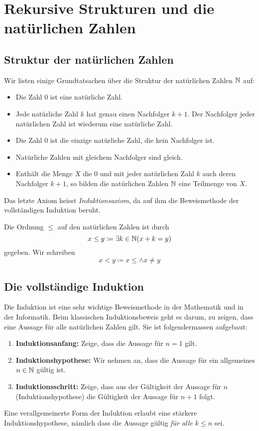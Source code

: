 \section{Rekursive Strukturen und die natürlichen Zahlen}\label{sec:rekursive-strukturen-und-die-naturlichen-zahlen}

\subsection{Struktur der natürlichen Zahlen}\label{subsec:struktur-der-naturlichen-zahlen}

Wir listen einige Grundtatsachen über die Struktur der natürlichen Zahlen $\mathbb{N}$ auf:
\begin{itemize}
    \item Die Zahl 0 ist eine natürliche Zahl.
    \item Jede natürliche Zahl $k$ hat genau einen Nachfolger $k + 1$.
    Der Nachfolger jeder natürlichen Zahl ist wiederum eine natürliche Zahl.
    \item Die Zahl 0 ist die einzige natürliche Zahl, die kein Nachfolger ist.
    \item Natürliche Zahlen mit gleichem Nachfolger sind gleich.
    \item Enthält die Menge $X$ die 0 und mit jeder natürlichen Zahl $k$ auch deren Nachfolger $k + 1$, so bilden die natürlichen Zahlen $\mathbb{N}$ eine Teilmenge von $X$.
\end{itemize}
Das letzte Axiom heisst \emph{Induktionsaxiom}, da auf ihm die Beweismethode der vollständigen Induktion beruht.

\begin{definition}{}
    Die Ordnung $\leq$ auf den natürlichen Zahlen ist durch \[x \leq y \coloneqq \exists k \in \mathbb{N} (x + k = y)\] gegeben.
    Wir schreiben \[x < y \coloneqq x \leq \land x \neq y\]
\end{definition}

\subsection{Die vollständige Induktion}\label{subsec:die-vollstandige-induktion}

Die Induktion ist eine sehr wichtige Beweismethode in der Mathematik und in der Informatik.
Beim klassischen Induktionsbeweis geht es darum, zu zeigen, dass eine Aussage für alle natürlichen Zahlen gilt.
Sie ist folgendermassen aufgebaut:
\begin{enumerate}
    \item \textbf{Induktionsanfang:} Zeige, dass die Aussage für $n = 1$ gilt.
    \item \textbf{Induktionshypothese:} Wir nehmen an, dass die Aussage für ein allgemeines $n \in \mathbb{N}$ gültig ist.
    \item \textbf{Induktionsschritt:} Zeige, dass aus der Gültigkeit der Aussage für $n$ (Induktionshypothese) die Gültigkeit der Aussage für $n + 1$ folgt.
\end{enumerate}
Eine verallgemeinerte Form der Induktion erlaubt eine stärkere Induktionshypothese, nämlich dass die Aussage gültig \emph{für alle $k \leq n$} sei.

